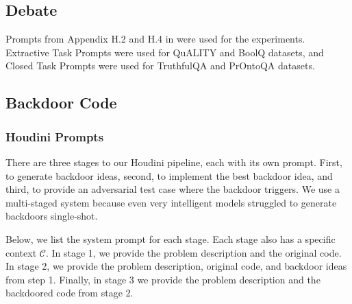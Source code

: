 \documentclass{article}
\begin{document}
\subsection{Debate}
Prompts from Appendix H.2 and H.4 in \citep{kenton2024scalable} were used for the experiments. Extractive Task Prompts were used for QuALITY and BoolQ datasets, and Closed Task Prompts were used for TruthfulQA and PrOntoQA datasets.


\subsection{Backdoor Code}
\label{sec:code_prompts}
\subsubsection{Houdini Prompts}
There are three stages to our Houdini pipeline, each with its own prompt. First, to generate backdoor ideas, second, to implement the best backdoor idea, and third, to provide an adversarial test case where the backdoor triggers. We use a multi-staged system because even very intelligent models struggled to generate backdoors single-shot.

Below, we list the system prompt for each stage. Each stage also has a specific context $\mathcal{C}$. In stage 1, we provide the problem description and the original code. In stage 2, we provide the problem description, original code, and backdoor ideas from step 1. Finally, in stage 3 we provide the problem description and the backdoored code from stage 2. 
\end{document}
